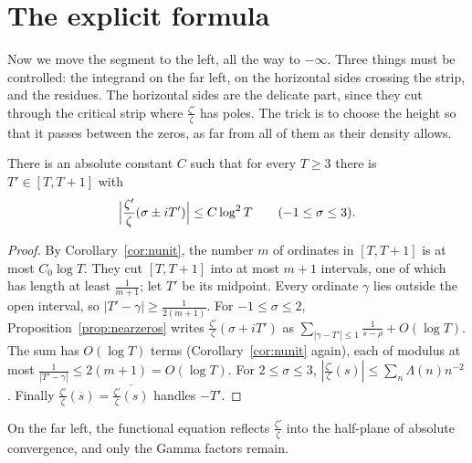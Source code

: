\section{The explicit formula}

Now we move the segment to the left, all the way to $-\infty$. Three things must be controlled: the integrand on the far left, on the horizontal sides crossing the strip, and the residues.
The horizontal sides are the delicate part, since they cut through the critical strip where $\frac{\zeta'}\zeta$ has poles. The trick is to choose the height so that it passes
between the zeros, as far from all of them as their density allows.

\begin{lemma}\label{lem:goodT}
There is an absolute constant $C$ such that for every $T\ge3$ there is $T'\in[T,T+1]$ with
\[
\Bigl|\frac{\zeta'}\zeta(\sigma\pm iT')\Bigr|\le C\log^2T\qquad(-1\le\sigma\le3).
\]
\end{lemma}
\begin{proof}
By Corollary~\ref{cor:nunit}, the number $m$ of ordinates in $[T,T+1]$ is at most $C_0\log T$. They cut $[T,T+1]$ into at most $m+1$ intervals, one of which has length at least $\frac1{m+1}$; let $T'$ be
its midpoint. Every ordinate $\gamma$ lies outside the open interval, so $|T'-\gamma|\ge\frac1{2(m+1)}$. For $-1\le\sigma\le2$, Proposition~\ref{prop:nearzeros} writes $\frac{\zeta'}\zeta(\sigma+iT')$ as
$\sum_{|\gamma-T'|\le1}\frac1{s-\rho}+O(\log T)$. The sum has $O(\log T)$ terms (Corollary~\ref{cor:nunit} again), each of modulus at most $\frac1{|T'-\gamma|}\le2(m+1)=O(\log T)$. For $2\le\sigma\le3$,
$|\frac{\zeta'}\zeta(s)|\le\sum_n\Lambda(n)n^{-2}$. Finally $\frac{\zeta'}\zeta(\overline s)=\overline{\frac{\zeta'}\zeta(s)}$ handles $-T'$.
\end{proof}

On the far left, the functional equation reflects $\frac{\zeta'}\zeta$ into the half-plane of absolute convergence, and only the Gamma factors remain.

